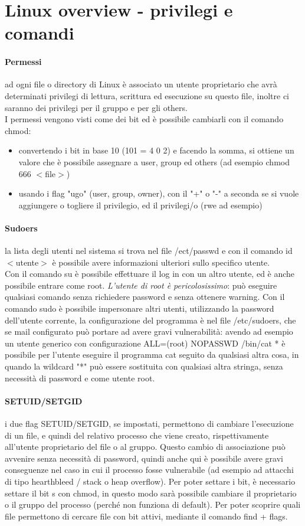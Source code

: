 \documentclass{article}
\begin{document}
\section{Linux overview - privilegi e comandi}
\paragraph{Permessi}ad ogni file o directory di Linux è associato un utente proprietario che avrà determinati privilegi di lettura, scrittura ed esecuzione su questo file, inoltre ci saranno dei privilegi per il gruppo e per gli others.\\ I permessi vengono visti come dei bit ed è possibile cambiarli con il comando \textsf{chmod}:
\begin{itemize}
\item convertendo i bit in base 10 (101 = 4 0 2) e facendo la somma, si ottiene un valore che è possibile assegnare a user, group ed others (ad esempio chmod 666 $<$file$>$)
\item usando i flag "ugo" (user, group, owner), con il "+" o "-" a seconda se si vuole aggiungere o togliere il privilegio, ed il privilegi/o (rwe ad esempio)
\end{itemize}
\paragraph{Sudoers}la lista degli utenti nel sistema si trova nel file \textsf{/ect/passwd} e con il comando \textsf{id} $<$utente$>$ è possibile avere informazioni ulteriori sullo specifico utente.\\ Con il comando \textsf{su} è possibile effettuare il log in con un altro utente, ed è anche possibile entrare come root. \textit{L'utente di root è pericolosissimo}: può eseguire qualsiasi comando senza richiedere password e senza ottenere warning. Con il comando sudo è possibile impersonare altri utenti, utilizzando la password dell'utente corrente, la configurazione del programma è nel file \textsf{/etc/sudoers}, che se mail configurato può portare ad avere gravi vulnerabilità: avendo ad esempio un utente generico con configurazione \textsf{ALL=(root) NOPASSWD /bin/cat *} è possibile per l'utente eseguire il programma cat seguito da qualsiasi altra cosa, in quando la wildcard "*" può essere sostituita con qualsiasi altra stringa, senza necessità di password e come utente root.
\paragraph{SETUID/SETGID}i due flag \textsf{SETUID/SETGID}, se impostati, permettono di cambiare l'esecuzione di un file, e quindi del relativo processo che viene creato, rispettivamente all'utente proprietario del file o al gruppo. Questo cambio di associazione può avvenire senza necessità di password, quindi anche qui è possibile avere gravi conseguenze nel caso in cui il processo fosse vulnerabile (ad esempio ad attacchi di tipo hearthbleed / stack o heap overflow). Per poter settare i bit, è necessario settare il bit s con \textsf{chmod}, in questo modo sarà possibile cambiare il proprietario o il gruppo del processo (perché non funziona di default). Per poter scoprire quali file permettono di cercare file con bit attivi, mediante il comando \textsf{find} + flags.
\end{document}
